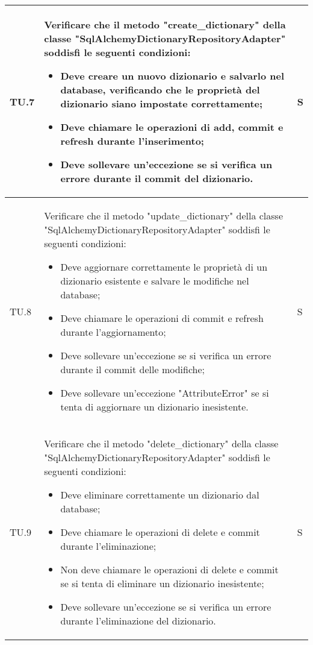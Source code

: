\begin{adjustwidth}{-0.5cm}{-0.5cm}
\begin{longtable}{|P{1.5cm}|>{\raggedright}P{9.5cm}|>{\arraybackslash}P{1.5cm}|}
		\hline TU.7 & Verificare che il metodo "create\_dictionary" della classe "SqlAlchemyDictionaryRepositoryAdapter" soddisfi le seguenti condizioni:
		\begin{itemize}
			\item Deve creare un nuovo dizionario e salvarlo nel database, verificando che le proprietà del dizionario siano impostate correttamente;
			\item Deve chiamare le operazioni di add, commit e refresh durante l'inserimento;
			\item Deve sollevare un'eccezione se si verifica un errore durante il commit del dizionario.
		\end{itemize} & S \\

		\hline TU.8 & Verificare che il metodo "update\_dictionary" della classe "SqlAlchemyDictionaryRepositoryAdapter" soddisfi le seguenti condizioni:
		\begin{itemize}
			\item Deve aggiornare correttamente le proprietà di un dizionario esistente e salvare le modifiche nel database;
			\item Deve chiamare le operazioni di commit e refresh durante l'aggiornamento;
			\item Deve sollevare un'eccezione se si verifica un errore durante il commit delle modifiche;
			\item Deve sollevare un'eccezione "AttributeError" se si tenta di aggiornare un dizionario inesistente.
		\end{itemize} & S \\

		\hline TU.9 & Verificare che il metodo "delete\_dictionary" della classe "SqlAlchemyDictionaryRepositoryAdapter" soddisfi le seguenti condizioni:
		\begin{itemize}
			\item Deve eliminare correttamente un dizionario dal database;
			\item Deve chiamare le operazioni di delete e commit durante l'eliminazione;
			\item Non deve chiamare le operazioni di delete e commit se si tenta di eliminare un dizionario inesistente;
			\item Deve sollevare un'eccezione se si verifica un errore durante l'eliminazione del dizionario.
		\end{itemize} & S \\


\end{longtable}
\end{adjustwidth}
